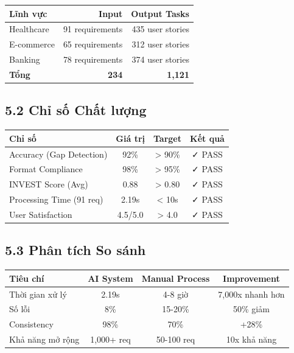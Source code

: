 \documentclass[12pt,a4paper]{article}
\begin{document}
\begin{table}[h]
\centering
\begin{tabular}{|l|r|r|}
\hline
\textbf{Lĩnh vực} & \textbf{Input} & \textbf{Output Tasks} \\
\hline
Healthcare & 91 requirements & 435 user stories \\
\hline
E-commerce & 65 requirements & 312 user stories \\
\hline
Banking & 78 requirements & 374 user stories \\
\hline
\textbf{Tổng} & \textbf{234} & \textbf{1,121} \\
\hline
\end{tabular}
\end{table}

\subsection{5.2 Chỉ số Chất lượng}

\begin{table}[h]
\centering
\begin{tabular}{|l|c|c|c|}
\hline
\textbf{Chỉ số} & \textbf{Giá trị} & \textbf{Target} & \textbf{Kết quả} \\
\hline
Accuracy (Gap Detection) & 92\% & > 90\% & ✓ PASS \\
\hline
Format Compliance & 98\% & > 95\% & ✓ PASS \\
\hline
INVEST Score (Avg) & 0.88 & > 0.80 & ✓ PASS \\
\hline
Processing Time (91 req) & 2.19s & < 10s & ✓ PASS \\
\hline
User Satisfaction & 4.5/5.0 & > 4.0 & ✓ PASS \\
\hline
\end{tabular}
\end{table}

\subsection{5.3 Phân tích So sánh}

\begin{table}[h]
\centering
\begin{tabular}{|l|c|c|c|}
\hline
\textbf{Tiêu chí} & \textbf{AI System} & \textbf{Manual Process} & \textbf{Improvement} \\
\hline
Thời gian xử lý & 2.19s & 4-8 giờ & 7,000x nhanh hơn \\
\hline
Số lỗi & 8\% & 15-20\% & 50\% giảm \\
\hline
Consistency & 98\% & 70\% & +28\% \\
\hline
Khả năng mở rộng & 1,000+ req & 50-100 req & 10x khả năng \\
\hline
\end{tabular}
\end{table}
\end{document}
